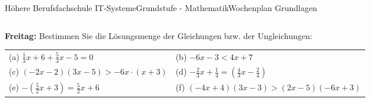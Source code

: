 \documentclass[oneside,openany,headings=optiontotoc,11pt,numbers=noenddot]{scrreprt}
\begin{document}
\begin{worksheet}{Höhere Berufsfachschule IT-Systeme}{Grundstufe - Mathematik}{Wochenplan Grundlagen}
\begin{framed}
\begin{tabularx}{\textwidth}{XXX}
			\end{tabularx}
		\end{framed}
		\begin{framed}
			\noindent
			\textbf{Freitag:} Bestimmen Sie die Lösungsmenge der Gleichungen bzw. der Ungleichungen:\\
			\begin{tabularx}{\textwidth}{XX}
				(a) \(\frac{1}{3}x + 6 + \frac{5}{3}x -5 = 0\) & (b) \(-6x-3 < 4x+7\)\\
				(c) \((-2x-2)(3x-5) > -6x\cdot(x+3)\) &	(d) \(-\frac{2}{3}x + \frac{1}{4} = (\frac{4}{3}x - \frac{2}{4})\)\\
				(e) \(-(\frac{5}{2}x+3) = \frac{5}{2}x +6\) & (f) \((-4x+4)(3x - 3) > (2x-5)(-6x +3)\)
			\end{tabularx}
		\end{framed}
	\end{worksheet}
\end{document}
